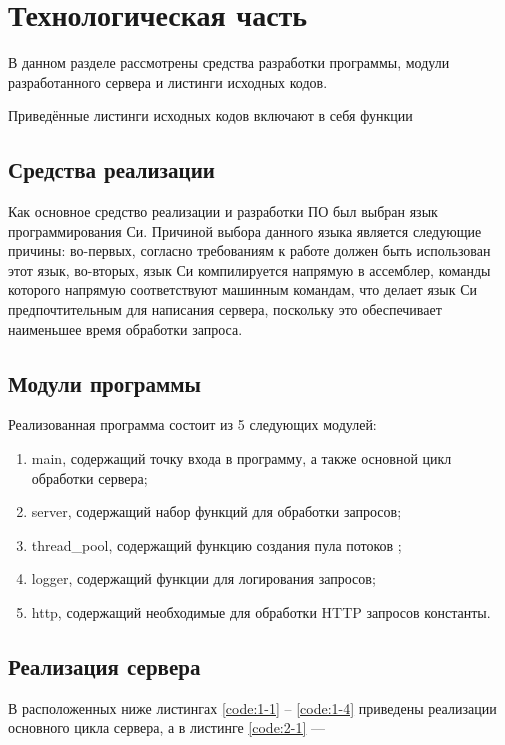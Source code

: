 \section{\large Технологическая часть}

В  данном  разделе  рассмотрены  средства  разработки  программы,  модули разработанного сервера и листинги исходных кодов.

Приведённые листинги исходных кодов включают в себя функции 

\subsection{Средства реализации}
Как  основное  средство  реализации  и  разработки  ПО  был  выбран  язык
программирования  Си.
Причиной  выбора  данного  языка  является следующие причины: во-первых, согласно требованиям к работе должен быть использован этот язык, во-вторых, язык Си компилируется напрямую в ассемблер, команды которого напрямую соответствуют машинным командам, что делает язык Си предпочтительным для написания сервера, поскольку это обеспечивает наименьшее время обработки запроса.

\subsection{Модули программы}

Реализованная программа состоит из 5 следующих модулей:
\begin{enumerate}[label=\arabic*)]
	\item main, содержащий точку входа в программу, а также основной цикл обработки сервера;
	\item server, содержащий набор функций для обработки запросов;
	\item thread\_pool, содержащий функцию создания пула потоков ;
	\item logger, содержащий функции для логирования запросов;
	\item http, содержащий необходимые для обработки HTTP запросов константы.
\end{enumerate}

\subsection{Реализация сервера}

В  расположенных  ниже  листингах \ref{code:1-1} -- \ref{code:1-4} приведены реализации основного цикла сервера, а в листинге \ref{code:2-1} --- 

